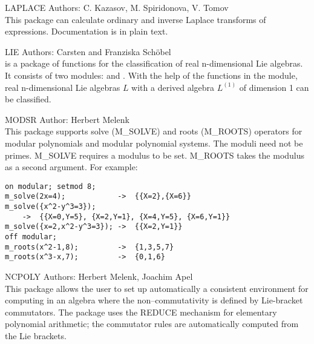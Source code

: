 \begin{Package}{LAPLACE}
Authors: C. Kazasov, M. Spiridonova, V. Tomov\\

This package can calculate ordinary and inverse Laplace transforms of
expressions.  Documentation is in plain text.
\end{Package}

\begin{Package}{LIE}
Authors: Carsten and Franziska Sch{\"o}bel\\

 is a package of functions for the classification of real
n-dimensional Lie algebras.  It consists of two modules: 
and .  With the help of the functions in the 
module, real n-dimensional Lie algebras $L$ with a derived algebra
$L^{(1)}$ of dimension 1 can be classified.
\end{Package}

\begin{Package}{MODSR}
Author: Herbert Melenk\\

This package supports solve (M\_SOLVE) and roots (M\_ROOTS) operators for
modular polynomials and modular polynomial systems.  The moduli need not
be primes. M\_SOLVE requires a modulus to be set.  M\_ROOTS takes the
modulus as a second argument. For example:

\begin{verbatim}
on modular; setmod 8;
m_solve(2x=4);            ->  {{X=2},{X=6}}
m_solve({x^2-y^3=3});
    ->  {{X=0,Y=5}, {X=2,Y=1}, {X=4,Y=5}, {X=6,Y=1}}
m_solve({x=2,x^2-y^3=3}); ->  {{X=2,Y=1}}
off modular;
m_roots(x^2-1,8);         ->  {1,3,5,7}
m_roots(x^3-x,7);         ->  {0,1,6}
\end{verbatim}
\end{Package}

\begin{Package}{NCPOLY}
Authors: Herbert Melenk, Joachim Apel\\

This package allows the user to set up automatically a consistent
environment for computing in an algebra where the non--commutativity is
defined by Lie-bracket commutators.  The package uses the REDUCE
 mechanism for elementary polynomial arithmetic; the commutator
rules are automatically computed from the Lie brackets.
\end{Package}

